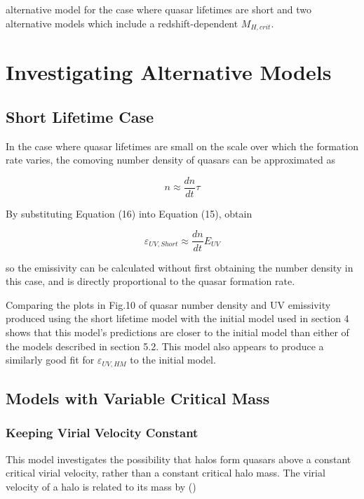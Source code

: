 \documentclass[12pt, twocolumn]{report}%
\begin{document}
\twocolumngrid


\noindent alternative model for the case where quasar lifetimes are short and two alternative models which include a redshift-dependent $M_{H,crit}$.

\section{Investigating Alternative Models}

\subsection{Short Lifetime Case}

In the case where quasar lifetimes are small on the scale over which the formation rate varies, the comoving number density of quasars can be approximated as

\begin{equation}
    n\approx\frac{dn}{dt}\tau
\end{equation}

\noindent By substituting Equation (16) into Equation (15), obtain

\begin{equation}
    \varepsilon_{UV,Short}\approx\frac{dn}{dt}E_{UV}
\end{equation}

\noindent so the emissivity can be calculated without first obtaining the number density in this case, and is directly proportional to the quasar formation rate.\par

Comparing the plots in Fig.10 of quasar number density and UV emissivity produced using the short lifetime model with the initial model used in section 4 shows that this model's predictions are closer to the initial model than either of the models described in section 5.2. This model also appears to produce a similarly good fit for $\varepsilon_{UV,HM}$ to the initial model.

\subsection{Models with Variable Critical Mass}
\subsubsection{Keeping Virial Velocity Constant}

This model investigates the possibility that halos form quasars above a constant critical virial velocity, rather than a constant critical halo mass. The virial velocity of a halo is related to its mass by (\cite{Ikea})
\end{document}
